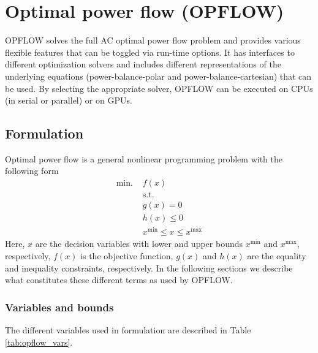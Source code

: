 \chapter{Optimal power flow (OPFLOW)}\label{chap:opflow}

OPFLOW solves the full AC optimal power flow problem and provides various flexible features that can be toggled via run-time options. It has interfaces to different optimization solvers and includes different representations of the underlying equations (power-balance-polar and power-balance-cartesian) that can be used. By selecting the appropriate solver, OPFLOW can be executed on CPUs (in serial or parallel) or on GPUs.

\section{Formulation}
Optimal power flow is a general nonlinear programming problem with the following form
\begin{align}
\text{min. }& f(x) \\
&\text{s.t.} \nonumber \\
& g(x) = 0 \\
& h(x) \le 0 \\
& x^{\text{min}} \le x \le x^{\text{max}}
\end{align}
Here, $x$ are the decision variables with lower and upper bounds $x^{\text{min}}$ and $x^{\text{max}}$, respectively, $f(x)$ is the objective function, $g(x)$ and $h(x)$ are the equality and inequality constraints, respectively. In the following sections we describe what constitutes these different terms as used by OPFLOW.

\subsection{Variables and bounds} \label{subsec:opflow_var}

The different variables used in \opflow formulation are described in Table \ref{tab:opflow_vars}.

